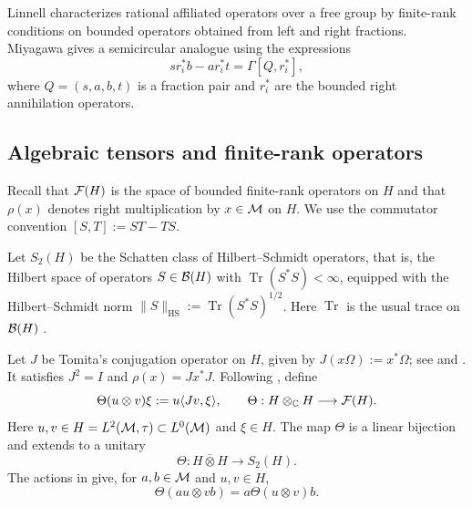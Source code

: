Linnell \cite[Theorem~1.1]{Lin00} characterizes rational affiliated operators over a free group by finite-rank conditions on bounded operators obtained from left and right fractions.
Miyagawa \cite[Section~4]{Miy22} gives a semicircular analogue using the expressions
\[
 s r_i^*b-a r_i^*t=\Gamma[Q,r_i^*],
\]
where $Q=(s,a,b,t)$ is a fraction pair and $r_i^*$ are the bounded right annihilation operators.

\subsection{Algebraic tensors and finite-rank operators}\label{subsec:finite-rank-tensors}

Recall that $\mathcal F(H)$ is the space of bounded finite-rank operators on $H$ and that $\rho(x)$ denotes right multiplication by $x\in\mathcal M$ on $H$.
We use the commutator convention $[S,T]:=ST-TS$.

Let $S_2(H)$ be the Schatten class of Hilbert--Schmidt operators, that is, the Hilbert space of operators $S\in\mathcal B(H)$ with $\operatorname{Tr}(S^*S)<\infty$, equipped with the Hilbert--Schmidt norm $\|S\|_{\operatorname{HS}}:=\operatorname{Tr}(S^*S)^{1/2}$.
Here $\operatorname{Tr}$ is the usual trace on $\mathcal B(H)$ \cite[Section 8.4]{AP18}.

Let $J$ be Tomita's conjugation operator on $H$, given by $J(x\Omega):=x^*\Omega$; see \cite[Section~7.1.1]{AP18} and \cite[p.~13]{MSY23}.
It satisfies $J^2=I$ and $\rho(x)=Jx^*J$.
Following \cite[Section~1.1, equation~(1.1)]{CS05}, define
\begin{equation}
 \Theta(u\otimes v)\xi:=u\langle Jv,\xi\rangle,
 \qquad \Theta:H\otimes_{\mathbb C}H\longrightarrow\mathcal F(H).
 \label{eq:theta}
\end{equation}
Here $u,v\in H=L^2(\mathcal M,\tau)\subset L^0(\mathcal M)$ and $\xi\in H$.
The map $\Theta$ is a linear bijection and extends to a unitary
\[
 \Theta:H\bar\otimes H\longrightarrow S_2(H).
\]
The actions in \cite[equation~(1.2)]{CS05} give, for $a,b\in\mathcal M$ and $u,v\in H$,
\[
 \Theta(au\otimes vb)=a\Theta(u\otimes v)b.
\]

